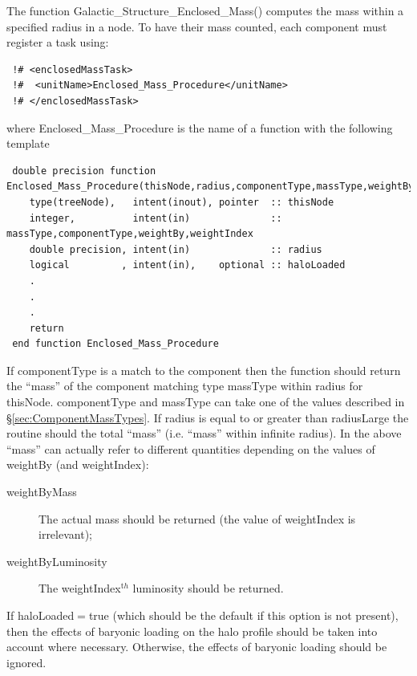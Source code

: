 The function {\normalfont \ttfamily Galactic\_Structure\_Enclosed\_Mass()} computes the mass within a specified radius in a node. To have their mass counted, each component must register a task using:
\begin{verbatim}
 !# <enclosedMassTask>
 !#  <unitName>Enclosed_Mass_Procedure</unitName>
 !# </enclosedMassTask>
\end{verbatim}
where {\normalfont \ttfamily Enclosed\_Mass\_Procedure} is the name of a function with the following template
\begin{verbatim}
 double precision function Enclosed_Mass_Procedure(thisNode,radius,componentType,massType,weightBy,weightIndex,haloLoaded)
    type(treeNode),   intent(inout), pointer  :: thisNode
    integer,          intent(in)              :: massType,componentType,weightBy,weightIndex
    double precision, intent(in)              :: radius
    logical         , intent(in),    optional :: haloLoaded
    .
    .
    .
    return
 end function Enclosed_Mass_Procedure
\end{verbatim}
If {\normalfont \ttfamily componentType} is a match to the component then the function should return the ``mass'' of the component matching type {\normalfont \ttfamily massType} within {\normalfont \ttfamily radius} for {\normalfont \ttfamily thisNode}.  {\normalfont \ttfamily componentType} and {\normalfont \ttfamily massType} can take one of the values described in \S\ref{sec:ComponentMassTypes}.
If {\normalfont \ttfamily radius} is equal to or greater than {\normalfont \ttfamily radiusLarge} the routine should the total ``mass'' (i.e. ``mass'' within infinite radius). In the above ``mass'' can actually refer to different quantities depending on the values of {\normalfont \ttfamily weightBy} (and {\normalfont \ttfamily weightIndex}):
\begin{description}
\item [{\normalfont \ttfamily weightByMass}] The actual mass should be returned (the value of {\normalfont \ttfamily weightIndex} is irrelevant);
\item [{\normalfont \ttfamily weightByLuminosity}] The {\normalfont \ttfamily weightIndex}$^{\mathrm th}$ luminosity should be returned.
\end{description}
If {\normalfont \ttfamily haloLoaded}$=${\normalfont \ttfamily true} (which should be the default if this option is not present), then the effects of baryonic loading on the halo profile should be taken into account where necessary. Otherwise, the effects of baryonic loading should be ignored.

